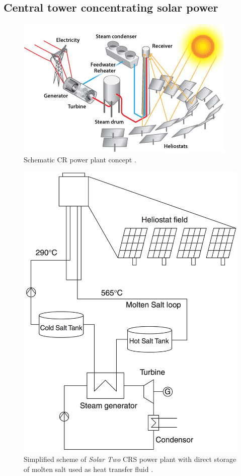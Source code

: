 
\pagebreak

\subsection{Central tower concentrating solar power} \label{subsection_CRS}

\begin{figure}[htbp] 
\centering
\includegraphics[width=0.6\linewidth]{FIG/power_tower}
\caption[Schematic CR power plant concept.]{Schematic CR power plant concept \cite{U.S.DOE2013}.}\label{power_tower}
\end{figure}


\begin{figure}[htbp]  
\centering
\includegraphics[width=0.45\linewidth]{FIG/towerdirecttwotank}
\caption[Simplified scheme of \emph{Solar Two} CRS power plant with direct storage of molten salt used as heat transfer fluid.]{Simplified scheme of \emph{Solar Two} CRS power plant with direct storage of molten salt used as heat transfer fluid \cite{Richter2013}.}\label{towerdirecttwotank}
\end{figure}

